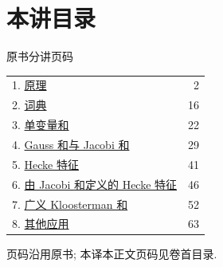 \section*{本讲目录}
\begingroup\small
\noindent\hfill 原书分讲页码\par\smallskip
\begin{tabular}{@{}p{.87\linewidth}r@{}}
1. \hyperref[VI:1]{原理} & 2\\
2. \hyperref[VI:2]{词典} & 16\\
3. \hyperref[VI:3]{单变量和} & 22\\
4. \hyperref[VI:4]{Gauss 和与 Jacobi 和} & 29\\
5. \hyperref[VI:5]{Hecke 特征} & 41\\
6. \hyperref[VI:6]{由 Jacobi 和定义的 Hecke 特征} & 46\\
7. \hyperref[VI:7]{广义 Kloosterman 和} & 52\\
8. \hyperref[VI:8]{其他应用} & 63
\end{tabular}
\par\medskip
\noindent 页码沿用原书; 本译本正文页码见卷首目录.
\endgroup
\clearpage

